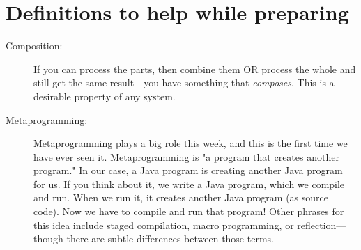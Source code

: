 \documentclass[twoside=false, DIV=14]{scrartcl}
\begin{document}
\section*{Definitions to help while preparing}
\begin{description}
\item[Composition:] If you can process the parts, then combine them OR process the whole and still get the same result—you have something that \emph{composes}. This is a desirable property of any system.

\item[Metaprogramming:] Metaprogramming plays a big role this week, and this is the first time we have ever seen it. Metaprogramming is "a program that creates another program." In our case, a Java program is creating another Java program for us. If you think about it, we write a Java program, which we compile and run. When we run it, it creates another Java program (as source code). Now we have to compile and run that program! Other phrases for this idea include staged compilation, macro programming, or reflection—though there are subtle differences between those terms.

\end{description}

\newpage
\end{document}
